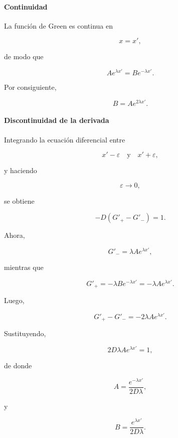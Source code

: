 \documentclass[11pt,spanish]{article}
\begin{document}
\paragraph{Continuidad}

La función de Green es continua en

\[
x=x',
\]

de modo que

\begin{equation}
Ae^{\lambda x'}
=
Be^{-\lambda x'}.
\end{equation}

Por consiguiente,

\begin{equation}
B
=
Ae^{2\lambda x'}.
\end{equation}

\paragraph{Discontinuidad de la derivada}

Integrando la ecuación diferencial entre

\[
x'-\varepsilon
\quad\text{y}\quad
x'+\varepsilon,
\]

y haciendo

\[
\varepsilon\rightarrow0,
\]

se obtiene

\begin{equation}
-D
\left(
G'_+-G'_-
\right)
=
1.
\end{equation}

Ahora,

\[
G'_-
=
\lambda Ae^{\lambda x'},
\]

mientras que

\[
G'_+
=
-\lambda Be^{-\lambda x'}
=
-\lambda Ae^{\lambda x'}.
\]

Luego,

\[
G'_+-G'_-
=
-2\lambda Ae^{\lambda x'}.
\]

Sustituyendo,

\[
2D\lambda
Ae^{\lambda x'}
=
1,
\]

de donde

\begin{equation}
A
=
\frac{e^{-\lambda x'}}
{2D\lambda},
\end{equation}

y

\begin{equation}
B
=
\frac{e^{\lambda x'}}
{2D\lambda}.
\end{equation}
\end{document}
